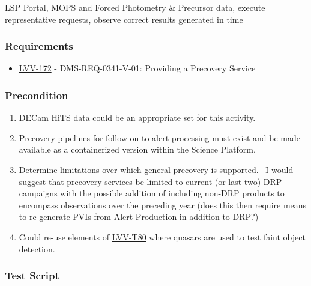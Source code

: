LSP Portal, MOPS and Forced Photometry \& Precursor data, execute
representative requests, observe correct results generated in time

\hypertarget{requirements-137}{%
\subsubsection{Requirements}\label{requirements-137}}

\begin{itemize}
\tightlist
\item
  \href{https://jira.lsstcorp.org/browse/LVV-172}{LVV-172} -
  DMS-REQ-0341-V-01: Providing a Precovery Service
\end{itemize}

\hypertarget{precondition-17}{%
\subsubsection{Precondition}\label{precondition-17}}

\begin{enumerate}
\tightlist
\item
  DECam HiTS data could be an appropriate set for this activity.
\item
  Precovery pipelines for follow-on to alert processing must exist and
  be made available as a containerized version within the Science
  Platform.
\item
  Determine limitations over which general precovery is supported. ~I
  would suggest that precovery services be limited to current (or last
  two) DRP campaigns with the possible addition of including non-DRP
  products to encompass observations over the preceding year (does this
  then require means to re-generate PVIs from Alert Production in
  addition to DRP?)
\item
  Could re-use elements of
  \href{https://jira.lsstcorp.org/secure/Tests.jspa\#/testCase/LVV-T80}{LVV-T80}
  where quasars are used to test faint object detection.
\end{enumerate}

\hypertarget{test-script-137}{%
\subsubsection{Test Script}\label{test-script-137}}

